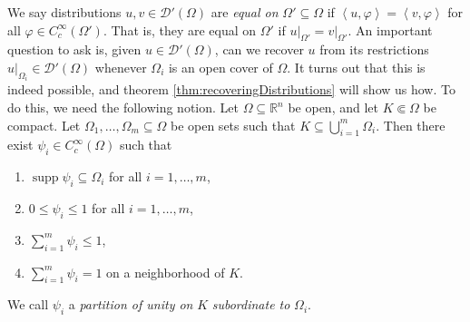 \documentclass{book}
\newcommand{\scrD}{\mathscr{D}}
\newcommand{\bbR}{\mathbb{R}}
\renewcommand{\phi}{\varphi}
\newcommand{\angles}[1]{\left\langle {#1} \right\rangle}
\DeclareMathOperator{\supp}{supp}
\theoremstyle{definition}
\theoremstyle{remark}
\numberwithin{equation}{chapter}
\begin{document}
We say distributions $u,v \in \scrD'(\Omega)$ are \textit{equal on} $\Omega' \subseteq \Omega$ if $\angles{u,\phi} = \angles{v,\phi}$ for all $\phi \in C_c^\infty(\Omega')$. That is, they are equal on $\Omega'$ if $u\vert_{\Omega'} = v\vert_{\Omega'}$. An important question to ask is, given $u \in \scrD'(\Omega)$, can we recover $u$ from its restrictions $u\vert_{\Omega_i} \in \scrD'(\Omega)$ whenever $\Omega_i$ is an open cover of $\Omega$. It turns out that this is indeed possible, and theorem \ref{thm:recoveringDistributions} will show us how. To do this, we need the following notion. Let $\Omega \subseteq \bbR^n$ be open, and let $K \Subset \Omega$ be compact. Let $\Omega_1,\dots,\Omega_m \subseteq \Omega$ be open sets such that $K \subseteq \bigcup_{i=1}^m \Omega_i$. Then there exist $\psi_i \in C_c^\infty(\Omega)$ such that 
\begin{enumerate}[label=(\roman*)]
    \item $\supp{\psi_i} \subseteq \Omega_i$ for all $i=1,\dots,m$,
    \item $0 \leq \psi_i \leq 1$ for all $i = 1,\dots,m$,
    \item $\sum_{i=1}^m \psi_i \leq 1$,
    \item $\sum_{i=1}^m \psi_i = 1$ on a neighborhood of $K$.
\end{enumerate}
We call $\psi_i$ a \textit{partition of unity on} $K$ \textit{subordinate to} $\Omega_i$.
\end{document}
